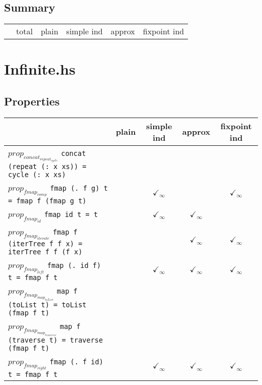 \documentclass{article}
\begin{document}
\subsection*{Summary}
\begin{longtable}{p{4cm} || c | c | c | c | c | }
  & total & plain & simple ind & approx & fixpoint ind \\
\end{longtable}

\section*{Infinite.hs}
\subsection*{Properties}
\begin{longtable}{p{10cm} || c | c | c | c | }
  & plain & simple ind & approx & fixpoint ind \\
\hline
$prop_{concat_{repeat_{cycle}}}$ \newline \verb`concat (repeat (: x xs)) = cycle (: x xs)` &  &  &  &  \\
\hline
$prop_{fmap_{comp}}$ \newline \verb`fmap (. f g) t = fmap f (fmap g t)` &  & $\checkmark_{\infty}$ &  & $\checkmark_{\infty}$ \\
\hline
$prop_{fmap_{id}}$ \newline \verb`fmap id t = t` &  & $\checkmark_{\infty}$ & $\checkmark_{\infty}$ &  \\
\hline
$prop_{fmap_{iterate}}$ \newline \verb`fmap f (iterTree f f x) = iterTree f f (f x)` &  &  & $\checkmark_{\infty}$ & $\checkmark_{\infty}$ \\
\hline
$prop_{fmap_{left}}$ \newline \verb`fmap (. id f) t = fmap f t` &  & $\checkmark_{\infty}$ & $\checkmark_{\infty}$ & $\checkmark_{\infty}$ \\
\hline
$prop_{fmap_{map_{toList}}}$ \newline \verb`map f (toList t) = toList (fmap f t)` &  &  &  &  \\
\hline
$prop_{fmap_{map_{traverse}}}$ \newline \verb`map f (traverse t) = traverse (fmap f t)` &  &  &  &  \\
\hline
$prop_{fmap_{right}}$ \newline \verb`fmap (. f id) t = fmap f t` &  & $\checkmark_{\infty}$ & $\checkmark_{\infty}$ & $\checkmark_{\infty}$ \\

\end{longtable}
\end{document}
